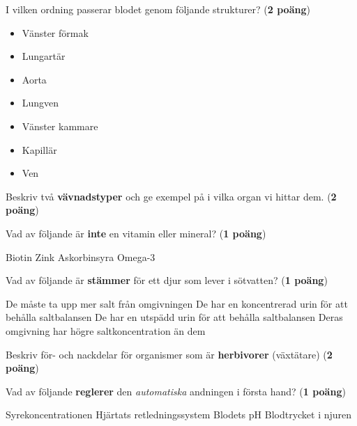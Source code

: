 \documentclass{exam}
\begin{document}
\vspace{5mm} %
\begin{center}
\end{center}
\begin{questions}

\question I vilken ordning passerar blodet genom följande strukturer? (\textbf{2 poäng})

\begin{itemize}
  \item Vänster förmak
  \item Lungartär
  \item Aorta
  \item Lungven
  \item Vänster kammare
  \item Kapillär
  \item Ven
\end{itemize}

\vspace{5mm} %

\question Beskriv två \textbf{vävnadstyper} och ge exempel på i vilka organ vi hittar dem. (\textbf{2 poäng})
\vspace{40mm}

\question Vad av följande är \textbf{inte} en vitamin eller mineral? (\textbf{1 poäng})
\begin{checkboxes}
    \choice Biotin
    \choice Zink
    \choice Askorbinsyra
    \choice Omega-3
\end{checkboxes}

\vspace{5mm}
\question Vad av följande är \textbf{stämmer} för ett djur som lever i sötvatten? (\textbf{1 poäng})
\begin{checkboxes}
    \choice De måste ta upp mer salt från omgivningen
    \choice De har en koncentrerad urin för att behålla saltbalansen
    \choice De har en utspädd urin för att behålla saltbalansen
    \choice Deras omgivning har högre saltkoncentration än dem
\end{checkboxes}
\break

\question Beskriv för- och nackdelar för organismer som är \textbf{herbivorer} (växtätare) (\textbf{2 poäng})
\vspace{40mm}

\question Vad av följande \textbf{reglerer} den \textit{automatiska} andningen i första hand? (\textbf{1 poäng})
\begin{checkboxes}
    \choice Syrekoncentrationen
    \choice Hjärtats retledningssystem
    \choice Blodets pH
    \choice Blodtrycket i njuren
\end{checkboxes}


\end{questions}
\end{document}
